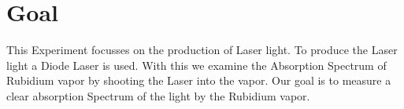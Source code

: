 \section{Goal}
\label{sec:Zielsetzung}

This Experiment focusses on the production of Laser light.
To produce the Laser light a Diode Laser is used.
With this we examine the Absorption Spectrum of Rubidium vapor by shooting the Laser into the vapor.
Our goal is to measure a clear absorption Spectrum of the light by the Rubidium vapor.